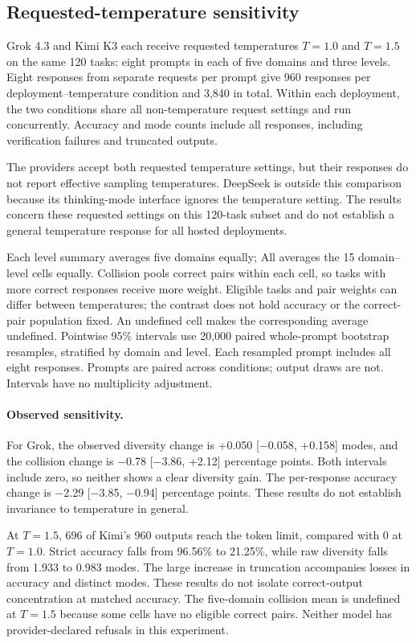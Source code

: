 \subsection{Requested-temperature sensitivity}
\label{app:hosted-temperature}
Grok 4.3 and Kimi K3 each receive requested temperatures $T=1.0$ and
$T=1.5$ on the same 120 tasks: eight prompts in each of five domains and
three levels. Eight responses from separate requests per prompt give 960
responses per deployment--temperature condition and 3,840 in total.
Within each deployment, the two conditions share all non-temperature
request settings and run concurrently. Accuracy and mode counts include
all responses, including verification failures and truncated outputs.

The providers accept both requested temperature settings, but their responses
do not report effective sampling temperatures. DeepSeek is outside this
comparison because its thinking-mode interface ignores the temperature setting.
The results concern these requested settings on this 120-task subset and
do not establish a general temperature response for all hosted deployments.

Each level summary averages five domains equally; All averages the 15
domain--level cells equally. Collision pools correct pairs within each cell,
so tasks with more correct responses receive more weight. Eligible tasks
and pair weights can differ between temperatures; the contrast does not
hold accuracy or the correct-pair population fixed. An undefined cell makes
the corresponding average undefined. Pointwise 95\% intervals use 20,000
paired whole-prompt bootstrap resamples, stratified by domain and level.
Each resampled prompt includes all eight responses. Prompts are paired
across conditions; output draws are not. Intervals have no multiplicity adjustment.

\paragraph{Observed sensitivity.}
For Grok, the observed diversity change is +0.050 [$-$0.058, +0.158] modes, and the collision change is $-$0.78 [$-$3.86, +2.12] percentage points. Both intervals include zero, so neither shows a clear diversity gain.
The per-response accuracy change is $-$2.29 [$-$3.85, $-$0.94] percentage points. These results do not establish invariance to temperature in general.

At $T=1.5$, 696 of Kimi's 960 outputs reach the token limit,
compared with 0 at $T=1.0$. Strict accuracy falls from 96.56\% to 21.25\%, while raw diversity falls from 1.933 to 0.983 modes.
The large increase in truncation accompanies losses in accuracy and distinct modes.
These results do not isolate correct-output concentration at matched accuracy.
The five-domain collision mean is undefined at
$T=1.5$ because some cells have no eligible correct pairs. Neither model
has provider-declared refusals in this experiment.


